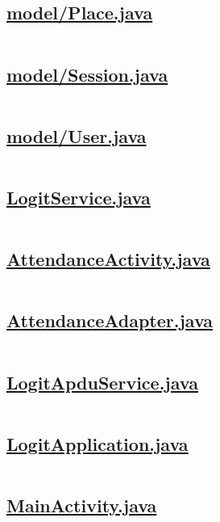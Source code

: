 \subsection{\small \url{model/Place.java}}
\inputminted{java}{../logit/android/app/src/main/java/ba/unsa/etf/logit/model/Place.java}

\subsection{\small \url{model/Session.java}}
\inputminted{java}{../logit/android/app/src/main/java/ba/unsa/etf/logit/model/Session.java}

\subsection{\small \url{model/User.java}}
\inputminted{java}{../logit/android/app/src/main/java/ba/unsa/etf/logit/model/User.java}

\subsection{\small \url{LogitService.java}}
\inputminted{java}{../logit/android/app/src/main/java/ba/unsa/etf/logit/api/LogitService.java}

\subsection{\small \url{AttendanceActivity.java}}
\inputminted{java}{../logit/android/app/src/main/java/ba/unsa/etf/logit/AttendanceActivity.java}

\subsection{\small \url{AttendanceAdapter.java}}
\inputminted{java}{../logit/android/app/src/main/java/ba/unsa/etf/logit/AttendanceAdapter.java}

\subsection{\small \url{LogitApduService.java}}
\inputminted{java}{../logit/android/app/src/main/java/ba/unsa/etf/logit/LogitApduService.java}

\subsection{\small \url{LogitApplication.java}}
\inputminted{java}{../logit/android/app/src/main/java/ba/unsa/etf/logit/LogitApplication.java}

\subsection{\small \url{MainActivity.java}}
\inputminted{java}{../logit/android/app/src/main/java/ba/unsa/etf/logit/MainActivity.java}